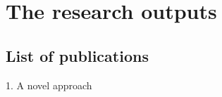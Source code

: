 \chapter{The research outputs} \label{ch:vita}

\section{List of publications} 

1. A novel approach
